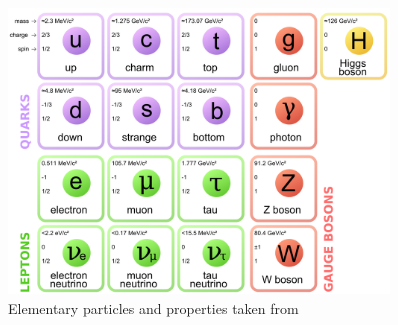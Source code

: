 \begin{figure}[!h]                
	\includegraphics[width=0.9\textwidth]{Chapter1/elementary_particle.png}
	\centering
	\begin{center}
		\caption{Elementary particles and properties taken from \cite{SMParticle}}
		\label{Fig:elementary_particle}            
	\end{center}
\end{figure}

